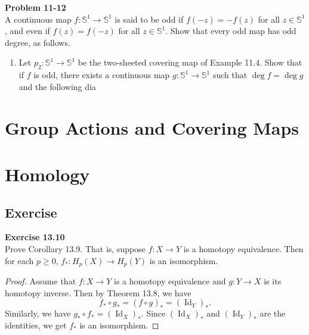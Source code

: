 \documentclass[12pt, a4paper]{article}
\theoremstyle{plain}
\newcommand{\mS}{\mathbb{S}}
\DeclareMathOperator{\Id}{Id}
\newenvironment{exercise}[2][Exercise]
    { \begin{mdframed}[backgroundcolor=gray!20] \textbf{#1 #2} \\}
    {  \end{mdframed}}
\newenvironment{problem}[2][Problem]
    { \begin{mdframed}[backgroundcolor=gray!20] \textbf{#1 #2} \\}
    {  \end{mdframed}}
\begin{document}
\begin{problem}{11-12}
    A continuous map $f\colon \mS^1\to \mS^1$ is said to be odd if $f(-z)=-f(z)$ for all $z\in \mS^1$, and even if $f(z)=f(-z)$ for all $z\in\mS^1$. Show that every odd map has odd degree, as follows.
    \begin{enumerate}[label=(\alph*)]
        \item Let $p_2\colon \mS^1\to \mS^1$ be the two-sheeted covering map of Example 11.4. Show that if $f$ is odd, there exists a continuous map $g\colon \mS^1\to \mS^1$ such that $\deg f=\deg g$ and the following dia
    \end{enumerate}
\end{problem}

\section{Group Actions and Covering Maps}


\pagebreak

\section{Homology}

\subsection{Exercise}

\begin{exercise}{13.10}
    Prove Corollary 13.9. That is, suppose $f\colon X\to Y$ is a homotopy equivalence. Then for each $p\geq 0$, $f_*\colon H_p(X)\to H_p(Y)$ is an isomorphism.
\end{exercise}
    \begin{proof}
        Assume that $f\colon X\to Y$ is a homotopy equivalence and $g\colon Y\to X$ is its homotopy inverse. Then by Theorem 13.8, we have
        \[
        f_*\circ g_* = (f\circ g)_* = (\Id_Y)_*.
        \]
        Similarly, we have $g_*\circ f_* = (\Id_X)_*$. Since $(\Id_X)_*$ and $(\Id_Y)_*$ are the identities, we get $f_*$ is an isomorphism.
    \end{proof}
\end{document}
